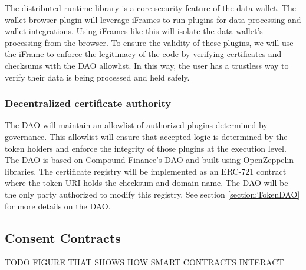 The distributed runtime library is a core security feature of the data wallet. The wallet browser plugin will leverage iFrames to run plugins for data processing and wallet integrations. Using iFrames like this will isolate the data wallet's processing from the browser. To ensure the validity of these plugins, we will use the iFrame to enforce the legitimacy of the code by verifying certificates and checksums with the DAO allowlist. In this way, the user has a trustless way to verify their data is being processed and held safely.

\subsubsection{Decentralized certificate authority}
\label{section:DAO}
The DAO will maintain an allowlist of authorized plugins determined by governance. This allowlist will ensure that accepted logic is determined by the token holders and enforce the integrity of those plugins at the execution level. The DAO is based on Compound Finance's DAO and built using OpenZeppelin libraries. The certificate registry will be implemented as an ERC-721 contract where the token URI holds the checksum and domain name. The DAO will be the only party authorized to modify this registry. See section \ref{section:TokenDAO} for more details on the DAO.

\subsection{Consent Contracts} %
\label{section:Contracts}
TODO FIGURE THAT SHOWS HOW SMART CONTRACTS INTERACT


